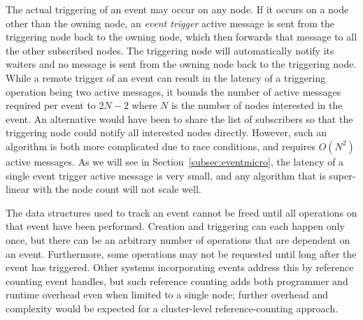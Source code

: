 The actual triggering of an event may occur on any node.  If it occurs on a node other than the owning
node, an {\em event trigger} active message is sent from the triggering node back to the owning node, which
then forwards that message to all the other subscribed nodes.  The triggering node will automatically
notify its waiters and no message is sent from the owning node back to the triggering node.
While a remote trigger of an event can result in
the latency of a triggering operation being two active messages, it bounds the number of active
messages required per event to $2N-2$ where $N$ is the number of nodes 
interested in the event.  An alternative
would have been to share the list of subscribers so that the triggering node could notify all interested
nodes directly.  However, such an algorithm is both more complicated due to race conditions, and requires $O(N^2)$
active messages.  As we will see in Section~\ref{subsec:eventmicro}, the latency of a single event trigger
active message is very small, and any algorithm that is super-linear with the node count will not scale well.

The data structures used to track an event cannot be freed until all operations on that event have been
performed.  Creation and triggering can each happen only once, but there can be an arbitrary number of operations
that are dependent on an event.   Furthermore, some operations may not be requested until long after the
event has triggered.  Other systems incorporating events address this by reference counting event
handles\cite{Khronos:OpenCL}, but such reference counting adds both programmer and runtime overhead even when
limited to a single node; further overhead and complexity would be expected for a cluster-level
reference-counting approach.

